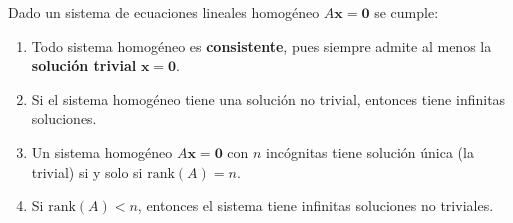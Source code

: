 \begin{theorem}
Dado un sistema de ecuaciones lineales homogéneo $A\mathbf{x}=\mathbf{0}$ se cumple:
\begin{enumerate}
\item Todo sistema homogéneo es \textbf{consistente}, pues siempre admite al menos la \textbf{solución trivial} $\mathbf{x} = \mathbf{0}$.
\item Si el sistema homogéneo tiene una solución no trivial, entonces tiene infinitas soluciones.
\item Un sistema homogéneo $A\mathbf{x} = \mathbf{0}$ con $n$ incógnitas tiene solución única (la trivial) si y solo si $\text{rank}(A) = n$.
\item Si $\text{rank}(A) < n$, entonces el sistema tiene infinitas soluciones no triviales.
\end{enumerate}
\end{theorem}

